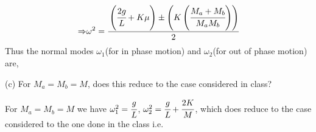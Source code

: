 \documentclass[addpoints]{exam}
\begin{document}
\begin{questions}
\begin{solution}
\begin{align*}
        \Rightarrow& \omega^2 = \cfrac{\left(\cfrac{2g}{L}+K\mu\right)\pm \left(K\left(\cfrac{M_a+M_b}{M_aM_b}\right)\right)}{2}\\ 
   \end{align*}
   Thus the normal modes $\omega_1$(for in phase motion) and $\omega_2$(for out of phase motion) are,\\
   \begin{center}
   \end{center}
   \end{solution}
(c) For $M_a=M_b=M$, does this reduce to the case considered in class?
\begin{solution}
    For $M_a=M_b=M$ we have $\omega_1^2 = \cfrac{g}{L}$, $\omega_2^2 = \cfrac{g}{L} + \cfrac{2K}{M}$, which does reduce to the case considered to the one done in the class i.e. 
    

\end{solution}
\end{questions}
\end{document}
